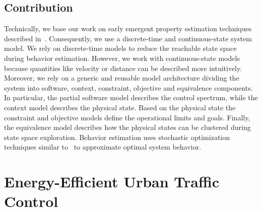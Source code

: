 \documentclass[conference]{../cls/IEEEtran}
\begin{document}
\subsection{Contribution}

Technically, we base our work on early emergent property estimation techniques described in~\cite{Hackenberg2012}. Consequently, we use a discrete-time and continuous-state system model. We rely on discrete-time models to reduce the reachable state space during behavior estimation. However, we work with continuous-state models because quantities like velocity or distance can be described more intuitively. Moreover, we rely on a generic and reusable model architecture dividing the system into software, context, constraint, objective and equivalence components. In particular, the partial software model describes the control spectrum, while the context model describes the physical state. Based on the physical state the constraint and objective models define the operational limits and goals. Finally, the equivalence model describes how the physical states can be clustered during state space exploration. Behavior estimation uses stochastic optimization techniques similar to~\cite{Pereira1991} to approximate optimal system behavior.

\section{Energy-Efficient Urban Traffic Control}
\end{document}
